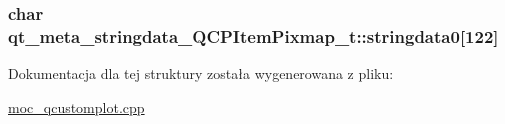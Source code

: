 \subsubsection[{\texorpdfstring{stringdata0}{stringdata0}}]{\setlength{\rightskip}{0pt plus 5cm}char qt\+\_\+meta\+\_\+stringdata\+\_\+\+Q\+C\+P\+Item\+Pixmap\+\_\+t\+::stringdata0\mbox{[}122\mbox{]}}\hypertarget{structqt__meta__stringdata___q_c_p_item_pixmap__t_aea88f01d1b77a98c2d9c3f2c64695c05}{}\label{structqt__meta__stringdata___q_c_p_item_pixmap__t_aea88f01d1b77a98c2d9c3f2c64695c05}


Dokumentacja dla tej struktury została wygenerowana z pliku\+:\begin{DoxyCompactItemize}
\item 
\hyperlink{moc__qcustomplot_8cpp}{moc\+\_\+qcustomplot.\+cpp}\end{DoxyCompactItemize}
